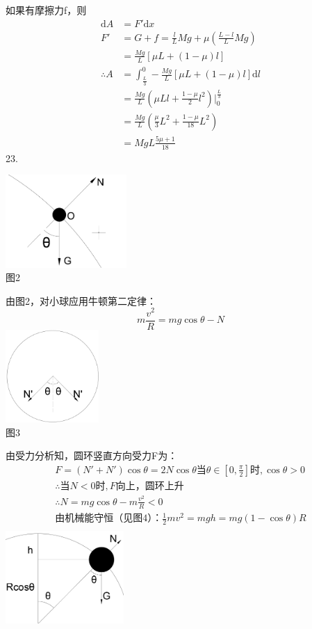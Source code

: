 \documentclass[blue, pad]{./templete/qyxfnote}
\newcommand{\di}[1]{\mathrm{d}#1}
\begin{document}
	如果有摩擦力f，则
	\begin{align*}
	\di{A}	&=F'\di{x}\\
	F'		&=G+f=\frac{l}{L}Mg+\mu\left(\frac{L-l}{L}Mg\right)\\
	&=\frac{Mg}{L}[\mu L+(1-\mu)l]\\
	\therefore A&=\int_{\frac{L}{3}}^{0} -\frac{Mg}{L}[\mu L+(1-\mu)l] \di{l}\\
	&=\frac{Mg}{L}\left(\mu Ll+\frac{1-\mu}{2}l^2\right)\left.\right|_{0}^{\frac{L}{3}}\\
	&=\frac{Mg}{L}\left(\frac{\mu}{3}L^2+\frac{1-\mu}{18}L^2\right)\\
	&=MgL\frac{5\mu +1}{18}
	\end{align*}
	23.\par
	\centering\includegraphics[height=100pt]{Chp2_illus2.png}\\
	图2\\
	\raggedright 由图2，对小球应用牛顿第二定律：
	\[m\frac{v^2}{R}=mg\cos\theta-N\]
	\centering\includegraphics[height=100pt]{Chp2_illus3.png}\\
	图3\\
	\raggedright 由受力分析知，圆环竖直方向受力F为：
	\begin{gather*}
	F=(N'+N')\cos\theta=2N\cos\theta
	\text{当}\theta\in[0,\frac{\pi}{2}]\text{时},\cos\theta>0\\
	\therefore\text{当}N<0\text{时},F\text{向上，圆环上升}\\
	\therefore N=mg\cos\theta-m\frac{v^2}{R}<0\\
	\text{由机械能守恒（见图4）：}\frac{1}{2}mv^2=mgh=mg(1-\cos\theta)R\\
	\end{gather*}
	\centering\includegraphics[height=100pt]{Chp2_illus4.png}\\
\end{document}
